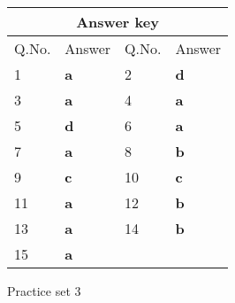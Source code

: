 \begin{table}[H]
	\centering
	
	\begin{tabular}{|p{1.5cm}|p{1.5cm}||p{1.5cm}|p{1.5cm}|}
		\hline
		\multicolumn{4}{|c|}{\textbf{Answer key}}\\\hline\hline
		\rowcolor{ocrel}Q.No.&Answer&Q.No.&Answer\\\hline
		1&\textbf{a}&2&\textbf{d}\\\hline
		3&\textbf{a}&4&\textbf{a}\\\hline
		5&\textbf{d}&6&\textbf{a}\\\hline
		7&\textbf{a}&8&\textbf{b}\\\hline
		9&\textbf{c}&10&\textbf{c}\\\hline
		11&\textbf{a}&12&\textbf{b}\\\hline
		13&\textbf{a}&14&\textbf{b}\\\hline
		15&\textbf{a}&&\\\hline
	\end{tabular}
\end{table}
\newpage
\begin{abox}
	Practice set 3
	\end{abox}
